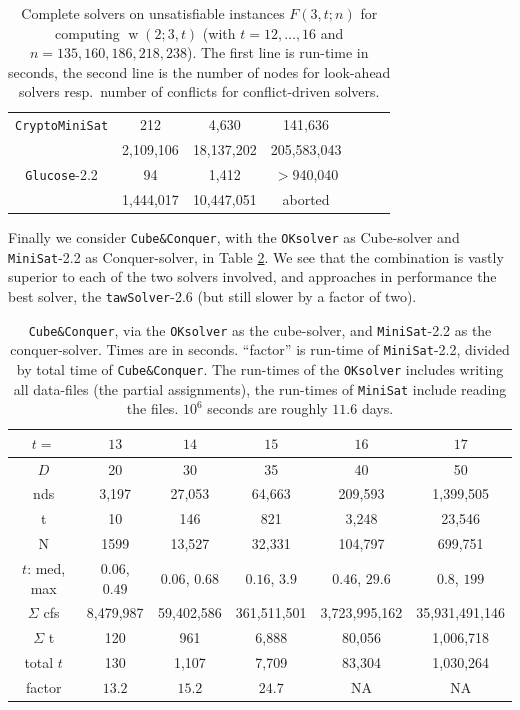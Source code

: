 \documentclass[final,3p,times]{elsarticle}
\theoremstyle{definition}
\newcommand{\tawsolver}{\texttt{tawSolver}}
\newcommand{\ntawsolver}{\tawsolver-2.6}
\newcommand{\oksolver}{\texttt{OKsolver}}
\newcommand{\minisat}{\texttt{MiniSat}}
\newcommand{\cryptomini}{\texttt{CryptoMiniSat}}
\newcommand{\glucose}{\texttt{Glucose}}
\newcommand{\cubeconq}{\texttt{Cube\:\&\:Conquer}}
\DeclareMathOperator{\vdw}{w}
\begin{document}
\begin{table}[H]
\begin{tabular}{c||c|c|c|c|c|c}
    \hline
    \cryptomini & 212 & 4,630 & 141,636\\
    & 2,109,106 & 18,137,202 & 205,583,043\\
    \hline
    \glucose-2.2 & 94 & 1,412 & $>$940,040\\
    & 1,444,017 & 10,447,051 & aborted\\
  \end{tabular}
  \caption{Complete solvers on unsatisfiable instances $F(3,t;n)$ for computing $\vdw(2;3,t)$ (with $t=12,\dots,16$ and $n=135, 160, 186, 218, 238$). The first line is run-time in seconds, the second line is the number of nodes for look-ahead solvers resp.\ number of conflicts for conflict-driven solvers.}
  \label{tab:complsolvervdw}
\end{table}

Finally we consider \cubeconq, with the \oksolver{} as Cube-solver and \minisat-2.2 as Conquer-solver, in Table \ref{tab:CCvdW}. We see that the combination is vastly superior to each of the two solvers involved, and approaches in performance the best solver, the \ntawsolver{} (but still slower by a factor of two).

\begin{table}[H]
  \centering
  \begin{tabular}{c||c|c|c|c|c}
    $t=$ & $13$ & $14$ & $15$ & $16$ & $17$\\
    \hline\hline
    $D$ & 20 & 30 & 35 & 40 & 50\\
    nds & 3,197 & 27,053 & 64,663 & 209,593 & 1,399,505\\
    t & 10 & 146 & 821 & 3,248 & 23,546\\
    N & 1599 & 13,527 & 32,331 & 104,797 & 699,751\\
    \hline
    $t$: med, max & $0.06$, $0.49$ & $0.06$, $0.68$ & $0.16$, $3.9$ & $0.46$, $29.6$ & $0.8$, $199$\\
    $\Sigma$ cfs & 8,479,987 & 59,402,586 & 361,511,501 & 3,723,995,162 & 35,931,491,146\\
    $\Sigma$ t & 120 & 961 & 6,888 & 80,056 & 1,006,718\\
    \hline
    total $t$ & 130 & 1,107 & 7,709 & 83,304 & 1,030,264\\
    \hline
    factor & $13.2$ & $15.2$ & $24.7$ & NA & NA
  \end{tabular}
  \caption{\cubeconq, via the \oksolver{} as the cube-solver, and \minisat-2.2 as the conquer-solver. Times are in seconds. ``factor'' is run-time of \minisat-2.2, divided by total time of \cubeconq. The run-times of the \oksolver{} includes writing all data-files (the partial assignments), the run-times of \minisat{} include reading the files. $10^6$ seconds are roughly $11.6$ days.}
  \label{tab:CCvdW}
\end{table}
\end{document}
